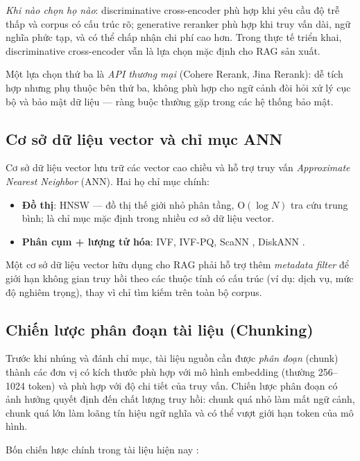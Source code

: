 \textit{Khi nào chọn họ nào}: discriminative cross-encoder phù hợp khi yêu cầu độ trễ thấp và corpus có cấu trúc rõ; generative reranker phù hợp khi truy vấn dài, ngữ nghĩa phức tạp, và có thể chấp nhận chi phí cao hơn. Trong thực tế triển khai, discriminative cross-encoder vẫn là lựa chọn mặc định cho RAG sản xuất.

Một lựa chọn thứ ba là \textit{API thương mại} (Cohere Rerank, Jina Rerank): dễ tích hợp nhưng phụ thuộc bên thứ ba, không phù hợp cho ngữ cảnh đòi hỏi xử lý cục bộ và bảo mật dữ liệu --- ràng buộc thường gặp trong các hệ thống bảo mật.

\subsection{Cơ sở dữ liệu vector và chỉ mục ANN}
\label{subsec:vector-db}

Cơ sở dữ liệu vector lưu trữ các vector cao chiều và hỗ trợ truy vấn \textit{Approximate Nearest Neighbor} (ANN). Hai họ chỉ mục chính:
\begin{itemize}
  \item \textbf{Đồ thị}: HNSW \cite{malkov2018hnsw} --- đồ thị thế giới nhỏ phân tầng, $\mathrm{O}(\log N)$ tra cứu trung bình; là chỉ mục mặc định trong nhiều cơ sở dữ liệu vector.
  \item \textbf{Phân cụm + lượng tử hóa}: IVF, IVF-PQ, ScaNN \cite{scann_2020}, DiskANN \cite{diskann_2019}.
\end{itemize}

Một cơ sở dữ liệu vector hữu dụng cho RAG phải hỗ trợ thêm \textit{metadata filter} để giới hạn không gian truy hồi theo các thuộc tính có cấu trúc (ví dụ: dịch vụ, mức độ nghiêm trọng), thay vì chỉ tìm kiếm trên toàn bộ corpus.

\subsection{Chiến lược phân đoạn tài liệu (Chunking)}
\label{subsec:chunking}

Trước khi nhúng và đánh chỉ mục, tài liệu nguồn cần được \textit{phân đoạn} (chunk) thành các đơn vị có kích thước phù hợp với mô hình embedding (thường 256--1024 token) và phù hợp với độ chi tiết của truy vấn. Chiến lược phân đoạn có ảnh hưởng quyết định đến chất lượng truy hồi: chunk quá nhỏ làm mất ngữ cảnh, chunk quá lớn làm loãng tín hiệu ngữ nghĩa và có thể vượt giới hạn token của mô hình.

Bốn chiến lược chính trong tài liệu hiện nay \cite{lewis2020rag,gao_rag_survey_2024,langchain_chunking_2024}:

